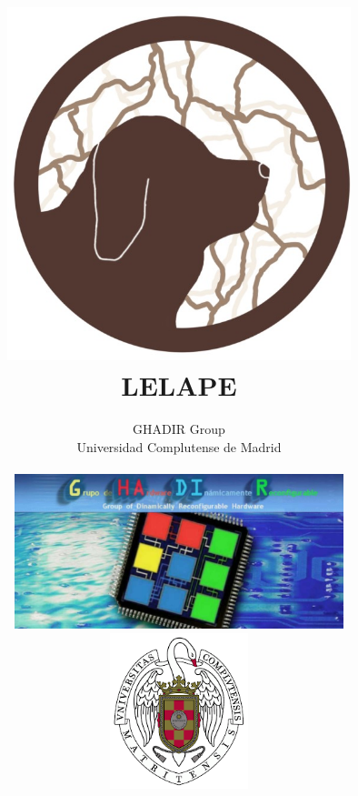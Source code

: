 \documentclass[a4paper,11pt]{book}
\begin{document}
\title{\includegraphics[width=10cm]{fig/LELAPE_LOGO.png}\\ \Huge{\textbf{LELAPE}}}
\author{GHADIR Group \\ Universidad Complutense de Madrid \\ \vspace{1cm}\\  \includegraphics[height=4.5cm]{fig/Ghadir_group.jpg}\hspace{1cm} \includegraphics[width=4cm]{fig/logo_ucm.png}}
\date{}



\frontmatter
\maketitle
\tableofcontents

\mainmatter





\backmatter


\end{document}
